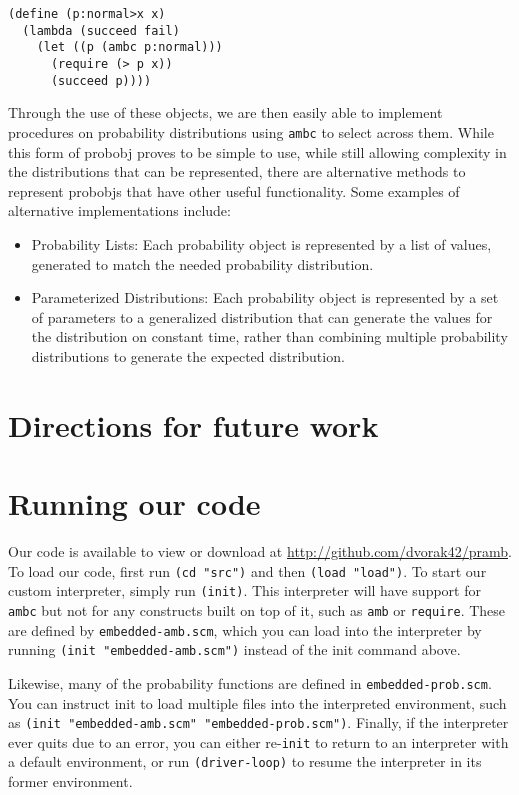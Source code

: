 \documentclass{article}
\begin{document}
\begin{lstlisting}
(define (p:normal>x x)
  (lambda (succeed fail)
    (let ((p (ambc p:normal)))
      (require (> p x))
      (succeed p))))
\end{lstlisting}

Through the use of these objects, we are then easily able to implement
procedures on probability distributions using \texttt{ambc} to select across
them. While this form of {probobj} proves to be simple to use, while still
allowing complexity in the distributions that can be represented, there are
alternative methods to represent {probobj}s that have other useful
functionality. Some examples of alternative implementations include:

\begin{itemize}
  \item Probability Lists: Each probability object is represented by a list of
    values, generated to match the needed probability distribution.
  \item Parameterized Distributions: Each probability object is represented by a
    set of parameters to a generalized distribution that can generate the values
    for the distribution on constant time, rather than combining multiple
    probability distributions to generate the expected distribution.
\end{itemize} 

\section{Directions for future work}

\appendix

\section{Running our code}

Our code is available to view or download at
\url{http://github.com/dvorak42/pramb}. To load our code, first run
\texttt{(cd "src")} and then \texttt{(load "load")}. To start our
custom interpreter, simply run \texttt{(init)}. This interpreter will
have support for \texttt{ambc} but not for any constructs built on top
of it, such as \texttt{amb} or \texttt{require}. These are defined by
\texttt{embedded-amb.scm}, which you can load into the interpreter by
running \texttt{(init "embedded-amb.scm")} instead of the init command
above.

Likewise, many of the probability functions are defined in
\texttt{embedded-prob.scm}. You can instruct init to load multiple
files into the interpreted environment, such as \texttt{(init
  "embedded-amb.scm" "embedded-prob.scm")}. Finally, if the
interpreter ever quits due to an error, you can either
re-\texttt{init} to return to an interpreter with a default
environment, or run \texttt{(driver-loop)} to resume the interpreter
in its former environment.
\end{document}
